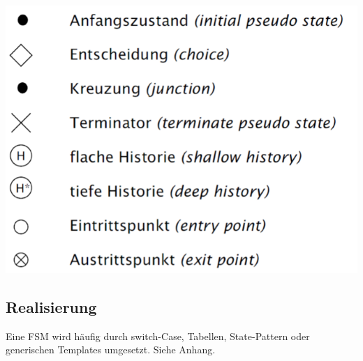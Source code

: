 \begin{center}
	\includegraphics[width=0.8\columnwidth]{Images/statechart_elemente}
\end{center}

\subsection{Realisierung}
Eine FSM wird häufig durch switch-Case, Tabellen, State-Pattern oder generischen Templates umgesetzt. Siehe Anhang.